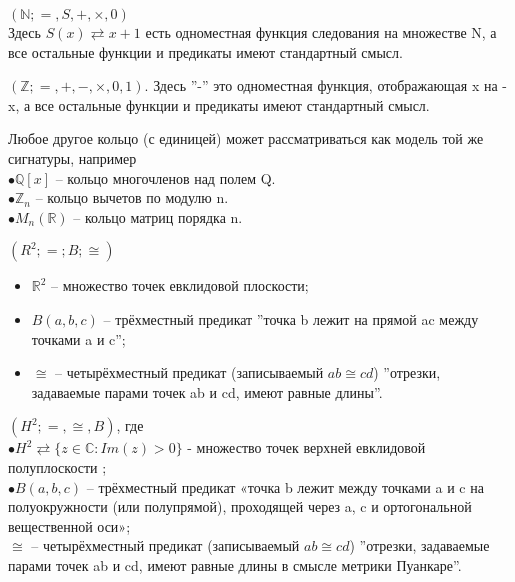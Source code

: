 \begin{example} 
	$(\mathbb{N}; =, S, +, \times, 0)$ \\
Здесь $S(x) \rightleftarrows x+1 $ есть одноместная функция следования на множестве N,
а все остальные функции и предикаты имеют стандартный смысл.
\end{example}

\begin{example} 
$(\mathbb{Z}; =,+,-,\times,0,1)$. Здесь ''-'' это одноместная функция, отображающая x на -x, а все остальные функции и предикаты имеют стандартный смысл.
\end{example}

\begin{example} 
Любое другое кольцо (с единицей) может рассматриваться как
модель той же сигнатуры, например\\
$\bullet  \mathbb{Q}[x]$ -- кольцо многочленов над полем Q.\\
$\bullet  \mathbb{Z}_{n}$ -- кольцо вычетов по модулю n.\\
$\bullet  M_{n}(\mathbb{R})$ -- кольцо матриц порядка n.
\end{example}

\begin{example}  $(R^{2};=;B;\cong)$
\begin{itemize}
	\item $\mathbb{R}^2$ -- множество точек евклидовой плоскости; \\
	\item $B(a, b ,c)$ -- трёхместный предикат ''точка b лежит на прямой ac между точками a и c'';\\
	\item $\cong$ -- четырёхместный предикат (записываемый $ab \cong cd$) ''отрезки, задаваемые парами точек ab и cd, имеют равные длины''.
\end{itemize}
\end{example}

\begin{example} 
 $(H^2; =,\cong, B)$, где \\
$\bullet H^2 \rightleftarrows \{z \in \mathbb{C} : Im(z)>0 \}$ - множество точек верхней евклидовой полуплоскости ; \\
$\bullet B(a, b ,c)$ -- трёхместный предикат «точка b лежит между точками a и c на полуокружности (или полупрямой), проходящей через a, c и ортогональной вещественной оси»;\\
\bullet $\cong$ -- четырёхместный предикат (записываемый $ab \cong cd$) ''отрезки, задаваемые парами точек ab и cd, имеют равные длины в смысле метрики Пуанкаре''.
\end{example}
